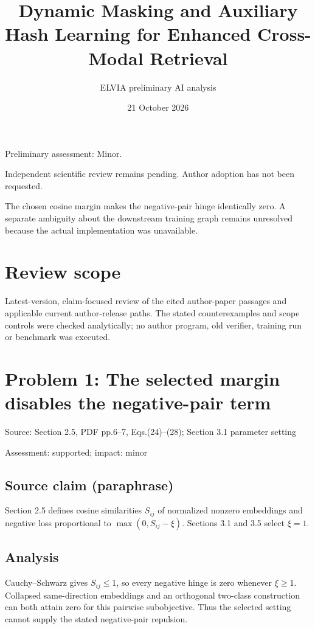 \documentclass[11pt]{article}
\begin{document}
\title{Dynamic Masking and Auxiliary Hash Learning for Enhanced Cross-Modal Retrieval}

\author{ELVIA preliminary AI analysis}\date{21 October 2026}\maketitle

Preliminary assessment: Minor.\par

Independent scientific review remains pending. Author adoption has not been requested.

The chosen cosine margin makes the negative-pair hinge identically zero. A separate ambiguity about the downstream training graph remains unresolved because the actual implementation was unavailable.

\section*{Review scope}

Latest-version, claim-focused review of the cited author-paper passages and applicable current author-release paths. The stated counterexamples and scope controls were checked analytically; no author program, old verifier, training run or benchmark was executed.

\section*{Problem 1: The selected margin disables the negative-pair term}

Source: Section 2.5, PDF pp.6–7, Eqs.(24)–(28); Section 3.1 parameter setting

Assessment: supported; impact: minor

\subsection*{Source claim (paraphrase)}

Section 2.5 defines cosine similarities \(S_{ij}\) of normalized nonzero embeddings and negative loss proportional to \(\max(0,S_{ij}-\xi)\). Sections 3.1 and 3.5 select \(\xi=1\).

\subsection*{Analysis}

Cauchy–Schwarz gives \(S_{ij}\leq1\), so every negative hinge is zero whenever \(\xi\geq1\). Collapsed same-direction embeddings and an orthogonal two-class construction can both attain zero for this pairwise subobjective. Thus the selected setting cannot supply the stated negative-pair repulsion.
\end{document}
